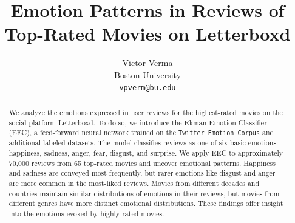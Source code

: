 \documentclass[11pt]{article}
\title{Emotion Patterns in Reviews of Top-Rated Movies on Letterboxd}
\author{Victor Verma \\
Boston University \\
\texttt{vpverm@bu.edu}}
\begin{document}
\maketitle
\begin{abstract}
We analyze the emotions expressed in user reviews for the highest-rated movies on the social platform Letterboxd. To do so, we introduce the Ekman Emotion Classifier (EEC), a feed-forward neural network trained on the \texttt{Twitter Emotion Corpus} and additional labeled datasets. The model classifies reviews as one of six basic emotions: happiness, sadness, anger, fear, disgust, and surprise. We apply EEC to approximately 70,000 reviews from 65 top-rated movies and uncover emotional patterns. Happiness and sadness are conveyed most frequently, but rarer emotions like disgust and anger are more common in the most-liked reviews. Movies from different decades and countries maintain similar distributions of emotions in their reviews, but movies from different genres have more distinct emotional distributions. These findings offer insight into the emotions evoked by highly rated movies.
\end{abstract}
\end{document}
